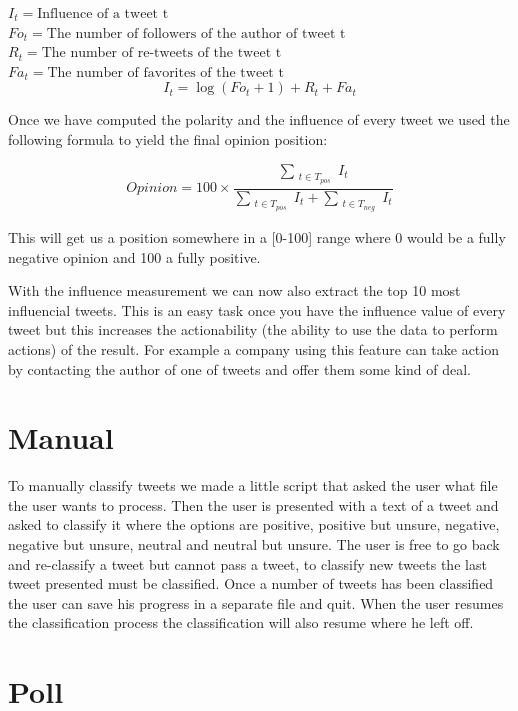 \documentclass[a4paper,12pt]{report}
\begin{document}
$I_t = \text{Influence of a tweet t}$\\
$Fo_t = \text{The number of followers of the author of tweet t}$\\
$R_t = \text{The number of re-tweets of the tweet t}$\\
$Fa_t = \text{The number of favorites of the tweet t}$\\
\begin{equation}
I_t = \log (Fo_t + 1) + R_t + Fa_t
\end{equation}

Once we have computed the polarity and the influence of every tweet we used the following formula to yield the final opinion position:

\begin{equation}
Opinion = 100 \times \frac{\sum_{\substack{t \in T_{pos}}} I_t}{\sum_{\substack{t \in T_{pos}}} I_t + \sum_{\substack{t \in T_{neg}}} I_t}
\end{equation}

This will get us a position somewhere in a [0-100] range where 0 would be a fully negative opinion and 100 a fully positive.

With the influence measurement we can now also extract the top 10 most influencial tweets. This is an easy task once you have the influence value of every tweet but this increases the actionability (the ability to use the data to perform actions) of the result. For example a company using this feature can take action by contacting the author of one of tweets and offer them some kind of deal.

\section{Manual}

To manually classify tweets we made a little script that asked the user what file the user wants to process. 
Then the user is presented with a text of a tweet and asked to classify it where the options are positive, positive but unsure, negative, negative but unsure, neutral and neutral but unsure. 
The user is free to go back and re-classify a tweet but cannot pass a tweet, to classify new tweets the last tweet presented must be classified. 
Once a number of tweets has been classified the user can save his progress in a separate file and quit. 
When the user resumes the classification process the classification will also resume where he left off.

\section{Poll}
\end{document}
